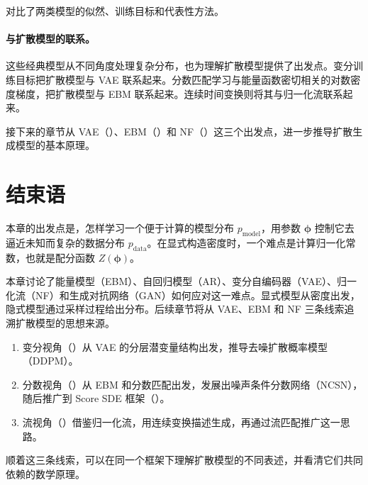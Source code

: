  对比了两类模型的似然、训练目标和代表性方法。
\begin{table}[th]
  \caption{显式和隐式生成模型的比较}
  \small
  \centering
  \label{tb:comparison-explicit-implicit}
\end{table}


\paragraph{与扩散模型的联系。}
这些经典模型从不同角度处理复杂分布，也为理解扩散模型提供了出发点。变分训练目标把扩散模型与 VAE 联系起来。分数匹配学习与能量函数密切相关的对数密度梯度，把扩散模型与 EBM 联系起来。连续时间变换则将其与归一化流联系起来。

接下来的章节从 VAE（）、EBM（）和 NF（）这三个出发点，进一步推导扩散生成模型的基本原理。


\section{结束语}\label{sec:ch1_cr}


本章的出发点是，怎样学习一个便于计算的模型分布 $p_{\text{model}}$，用参数 $\bm{\phi}$ 控制它去逼近未知而复杂的数据分布 $p_{\text{data}}$。在显式构造密度时，一个难点是计算归一化常数，也就是配分函数 $Z(\bm{\phi})$。


本章讨论了能量模型（EBM）、自回归模型（AR）、变分自编码器（VAE）、归一化流（NF）和生成对抗网络（GAN）如何应对这一难点。显式模型从密度出发，隐式模型通过采样过程给出分布。后续章节将从 VAE、EBM 和 NF 三条线索追溯扩散模型的思想来源。
\begin{enumerate}
    \item 变分视角（）从 VAE 的分层潜变量结构出发，推导去噪扩散概率模型（DDPM）。
    \item 分数视角（）从 EBM 和分数匹配出发，发展出噪声条件分数网络（NCSN），随后推广到 Score SDE 框架（）。
    \item 流视角（）借鉴归一化流，用连续变换描述生成，再通过流匹配推广这一思路。
\end{enumerate}

顺着这三条线索，可以在同一个框架下理解扩散模型的不同表述，并看清它们共同依赖的数学原理。
